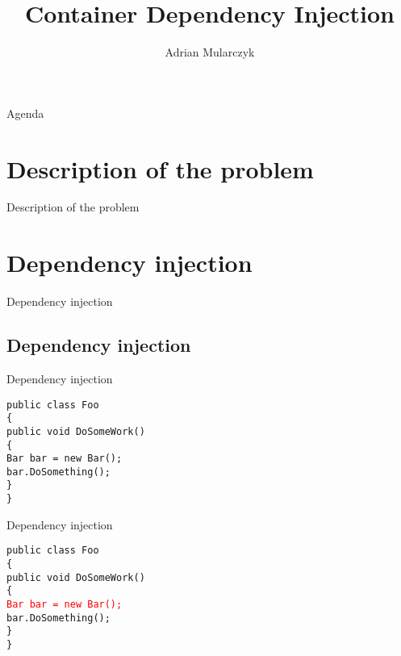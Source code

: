 \documentclass{beamer}
\title[]
{Container Dependency Injection}
\author[Adrian Mularczyk]{Adrian Mularczyk}
\date{}
\newcommand{\code}[1]{{\texttt{#1}}}
\begin{document}
\begin{frame}
  \titlepage 
\end{frame}

\begin{frame}{Agenda}
  \tableofcontents
\end{frame}

\section{Description of the problem}

\begin{frame}{}
	\begin{center}
		\Huge{Description of the problem}
	\end{center}
\end{frame}

\section{Dependency injection}

\begin{frame}{}
	\begin{center}
		\Huge{Dependency injection}
	\end{center}
\end{frame}

\subsection*{Dependency injection}

\begin{frame}{Dependency injection}
     \begin{large}
	\code{public class Foo}\\
	\code{\{}\\ \quad
		\code{public void DoSomeWork()}\\ \quad
		\code{\{}\\ \qquad
		\code{Bar bar = new Bar();}\\ \qquad
		\code{bar.DoSomething();}\\ \quad
		\code{\}}\\
	\code{\}}
     \end{large}
\end{frame}

\begin{frame}{Dependency injection}
     \begin{large}
	\code{public class Foo}\\
	\code{\{}\\ \quad
		\code{public void DoSomeWork()}\\ \quad
		\code{\{}\\ \qquad
		\code{\textcolor{red}{Bar bar = new Bar();}}\\ \qquad
		\code{bar.DoSomething();}\\ \quad
		\code{\}}\\
	\code{\}}
     \end{large}
\end{frame}
\end{document}
